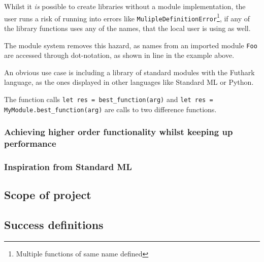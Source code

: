 Whilst it \textit{is} possible to create libraries without a module
implementation, the user runs a risk of running into errors like
\texttt{MulipleDefinitionError}\footnote{Multiple functions of same name
  defined}, if any of the library functions uses any of the names, that the
local user is using as well.

The module system removes this hazard, as names from an imported module
\texttt{Foo} are accessed through dot-notation, as shown in line %
in the example above.

An obvious use case is including a library of standard modules with the Futhark
language, as the ones displayed in other languages like Standard
ML\cite{sml_standard_lib} or Python\cite{python3_docs}.




The function calls \texttt{let res = best_function(arg)} and
\texttt{let res = MyModule.best_function(arg)} are calls to two difference
functions.



\subsubsection{Achieving higher order functionality whilst keeping up performance}
\label{subsec:label}

\subsubsection{Inspiration from Standard ML}

\subsection{Scope of project}
\label{subsec:label}

\subsection{Success definitions}
\label{subsec:label}

